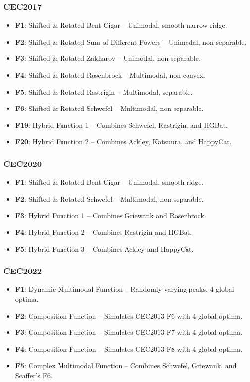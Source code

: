 \documentclass[12pt]{article}
\begin{document}
\subsubsection*{CEC2017}
\begin{itemize}
    \item \textbf{F1}: Shifted \& Rotated Bent Cigar – Unimodal, smooth narrow ridge.
    \item \textbf{F2}: Shifted \& Rotated Sum of Different Powers – Unimodal, non-separable.
    \item \textbf{F3}: Shifted \& Rotated Zakharov – Unimodal, non-separable.
    \item \textbf{F4}: Shifted \& Rotated Rosenbrock – Multimodal, non-convex.
    \item \textbf{F5}: Shifted \& Rotated Rastrigin – Multimodal, separable.
    \item \textbf{F6}: Shifted \& Rotated Schwefel – Multimodal, non-separable.
    \item \textbf{F19}: Hybrid Function 1 – Combines Schwefel, Rastrigin, and HGBat.
    \item \textbf{F20}: Hybrid Function 2 – Combines Ackley, Katsuura, and HappyCat.
\end{itemize}

\subsubsection*{CEC2020}
\begin{itemize}
    \item \textbf{F1}: Shifted \& Rotated Bent Cigar – Unimodal, smooth ridge.
    \item \textbf{F2}: Shifted \& Rotated Schwefel – Multimodal, non-separable.
    \item \textbf{F3}: Hybrid Function 1 – Combines Griewank and Rosenbrock.
    \item \textbf{F4}: Hybrid Function 2 – Combines Rastrigin and HGBat.
    \item \textbf{F5}: Hybrid Function 3 – Combines Ackley and HappyCat.
\end{itemize}

\subsubsection*{CEC2022}
\begin{itemize}
    \item \textbf{F1}: Dynamic Multimodal Function – Randomly varying peaks, 4 global optima.
    \item \textbf{F2}: Composition Function – Simulates CEC2013 F6 with 4 global optima.
    \item \textbf{F3}: Composition Function – Simulates CEC2013 F7 with 4 global optima.
    \item \textbf{F4}: Composition Function – Simulates CEC2013 F8 with 4 global optima.
    \item \textbf{F5}: Complex Multimodal Function – Combines Schwefel, Griewank, and Scaffer’s F6.
\end{itemize}
\end{document}
